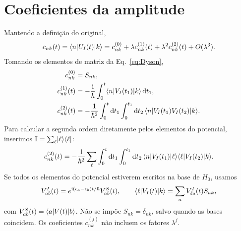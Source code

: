 \section{Coeficientes da amplitude}
Mantendo a definição do original,
\begin{equation}
 c_{nk}(t)=\langle n\rvert U_I(t)\lvert k\rangle
 =c_{nk}^{(0)}+\lambda c_{nk}^{(1)}(t)
 +\lambda^2c_{nk}^{(2)}(t)+O(\lambda^3).
 \label{eq:cseries}
\end{equation}
Tomando os elementos de matriz da Eq.~\eqref{eq:Dyson},
\begin{align}
 c_{nk}^{(0)}&=S_{nk},\label{eq:c0}\\
 c_{nk}^{(1)}(t)&=-\frac{\mathrm i}{\hbar}
   \int_0^t\langle n\rvert V_I(t_1)\lvert k\rangle\,\mathrm d t_1,\label{eq:c1}\\
 c_{nk}^{(2)}(t)&=-\frac{1}{\hbar^2}
   \int_0^t\mathrm d t_1\int_0^{t_1}\mathrm d t_2\,
   \langle n\rvert V_I(t_1)V_I(t_2)\lvert k\rangle.\label{eq:c2}
\end{align}
Para calcular a segunda ordem diretamente pelos elementos do potencial,
inserimos $\mathbb I=\sum_\ell\lvert \ell\rangle\langle \ell\rvert$:
\begin{equation}
 c_{nk}^{(2)}(t)=-\frac{1}{\hbar^2}\sum_\ell
 \int_0^t\mathrm d t_1\int_0^{t_1}\mathrm d t_2\,
 \langle n\rvert V_I(t_1)\lvert \ell\rangle\langle \ell\rvert V_I(t_2)\lvert k\rangle.
 \label{eq:c2sum}
\end{equation}
Se todos os elementos do potencial estiverem escritos na base de $H_0$,
usamos
\begin{equation}
 V^I_{ab}(t)=e^{\mathrm i(\epsilon_a-\epsilon_b)t/\hbar}V^S_{ab}(t),
 \qquad \langle \ell\rvert V_I(t)\lvert k\rangle=\sum_a V^I_{\ell a}(t)S_{ak},
 \label{eq:phase}
\end{equation}
com $V^S_{ab}(t)=\langle a\rvert V(t)\lvert b\rangle$.
Não se impõe $S_{nk}=\delta_{nk}$, salvo quando as bases coincidem.
Os coeficientes $c_{nk}^{(j)}$ não incluem os fatores $\lambda^j$.

\newpage

